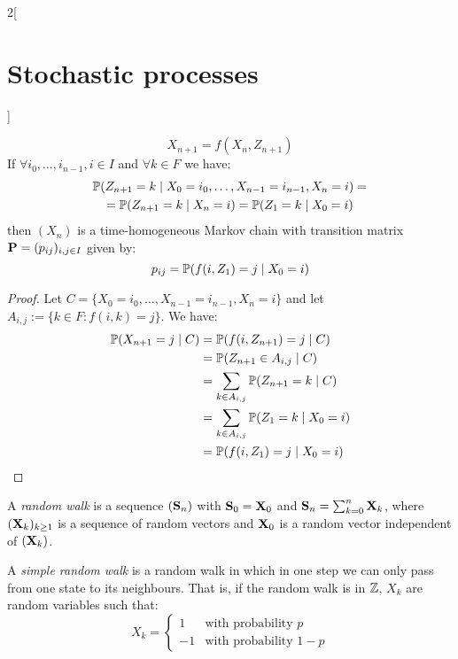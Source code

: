 \documentclass[../../../main_math.tex]{subfiles}
\begin{document}
\begin{multicols}{2}[\section{Stochastic processes}]
\begin{lemma}
    $$
      X_{n+1}=f(X_n,Z_{n+1})
    $$
    If $\forall i_0,\ldots,i_{n-1},i\in I$ and $\forall k\in F$ we have:
    \begin{multline*}
      \mathbb{P}(Z_{n+1}=k\mid X_0=i_0,\ldots,X_{n-1}=i_{n-1},X_n=i)=\\=\mathbb{P}(Z_{n+1}=k\mid X_n=i)=\mathbb{P}(Z_{1}=k\mid X_0=i)
    \end{multline*}
    then $(X_n)$ is a time-homogeneous Markov chain with transition matrix $\boldsymbol{\mathrm{P}}=(p_{ij})_{i,j\in I}$ given by:
    $$
      p_{ij}=\mathbb{P}(f(i,Z_1)=j\mid X_0=i)
    $$
  \end{lemma}
  \begin{proof}
    Let $C=\{X_0=i_0,\ldots,X_{n-1}=i_{n-1},X_n=i\}$ and let $A_{i,j}:=\{k\in F:f(i,k)=j\}$. We have:
    \begin{align*}
      \mathbb{P}(X_{n+1}=j\mid C) & =\mathbb{P}(f(i,Z_{n+1})=j\mid C)                 \\
                             & =\mathbb{P}(Z_{n+1}\in A_{i,j}\mid C)             \\
                             & =\sum_{k\in A_{i,j}}\mathbb{P}(Z_{n+1}=k\mid C)   \\
                             & =\sum_{k\in A_{i,j}}\mathbb{P}(Z_{1}=k\mid X_0=i) \\
                             & =\mathbb{P}(f(i,Z_{1})=j\mid X_0=i)
    \end{align*}
  \end{proof}
  \begin{definition}
    A \emph{random walk} is a sequence $(\boldsymbol{\mathrm{S}}_n)$ with $\boldsymbol{\mathrm{S}}_0=\boldsymbol{\mathrm{X}}_0$ and $\boldsymbol{\mathrm{S}}_n=\sum_{k=0}^{n}\boldsymbol{\mathrm{X}}_k$, where $(\boldsymbol{\mathrm{X}}_k)_{k\geq 1}$ is a sequence of \iid random vectors and $\boldsymbol{\mathrm{X}}_0$ is a random vector independent of $(\boldsymbol{\mathrm{X}}_k)$.
  \end{definition}
  \begin{definition}
    A \emph{simple random walk} is a random walk in which in one step we can only pass from one state to its neighbours. That is, if the random walk is in $\mathbb{Z}$, $X_k$ are random variables such that:
    $$
      X_k=\begin{cases}
        1  & \text{with probability $p$}   \\
        -1 & \text{with probability $1-p$}
      \end{cases}
    $$
  \end{definition}
  \begin{figure}[H]
    \centering
    

\end{figure}
\end{multicols}
\end{document}
